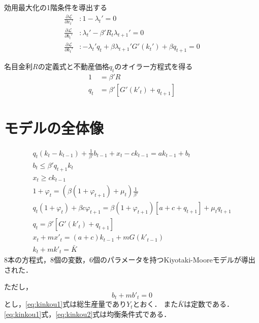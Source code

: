 \documentclass[dvipdfmx]{jlreq}
\begin{document}
効用最大化の1階条件を導出する
\begin{align}
  \frac{\partial \mathcal{L}}{\partial x_t'} &: 1 - \lambda_t' = 0 \\
  \frac{\partial \mathcal{L}}{\partial b_t'} &: \lambda_t' - \beta' R_t \lambda_{t+1}' = 0 \\
  \frac{\partial \mathcal{L}}{\partial k_t'} &: -\lambda_t' q_t + \beta \lambda_{t+1}' G'(k_t') + \beta q_{t+1} = 0
\end{align}

名目金利$R$の定義式と不動産価格$q_t$のオイラー方程式を得る
\begin{align}
  1 &= \beta' R \\
  q_t &= \beta' [G'(k'_t) + q_{t+1}]
\end{align}

\newpage

\section{モデルの全体像}
\begin{gather}
  q_t(k_t - k_{t-1}) + \frac{1}{\beta'} b_{t-1} + x_t - c k_{t-1} = a k_{t-1} + b_t \\
  b_t \leq \beta' q_{t+1} k_t \\
  x_t \geq c k_{t-1} \\
  1 + \varphi_t = (\beta(1+\varphi_{t+1}) + \mu_t) \frac{1}{\beta'} \label{} \\
  q_t (1 + \varphi_t) + \beta c \varphi_{t+1} = \beta(1 + \varphi_{t+1})[a + c + q_{t+1}] + \mu_t q_{t+1} \\
  q_t = \beta' [G'(k'_t) + q_{t+1}] \\
  x_t + m x'_t = (a + c) k_{t-1} + m G(k'_{t-1}) \label{eq:kinkou1} \\
  k_t + m k'_t = \bar{K} \label{eq:kinkou2}
\end{gather}
8本の方程式，8個の変数，6個のパラメータを持つKiyotaki-Mooreモデルが導出された．

ただし，
\begin{equation}
  b_t + m b'_t = 0
\end{equation}
とし，\eqref{eq:kinkou1}式は総生産量であり$Y_t$とおく．
また$\bar{K}$は定数である．\eqref{eq:kinkou1}式，\eqref{eq:kinkou2}式は均衡条件式である．
\end{document}
